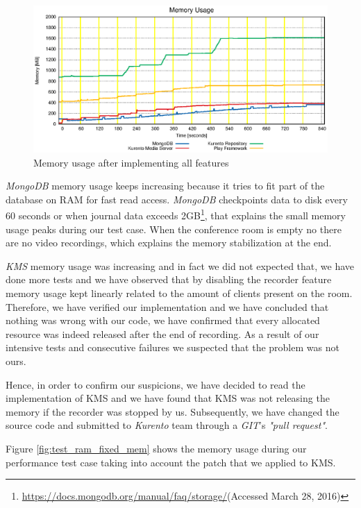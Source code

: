 \begin{figure}[!htb]
  \centering
  \includegraphics[width=\textwidth]{stats/test_full_features_mem.eps}
  \caption{Memory usage after implementing all features}
  \label{fig:test_full_features_mem}
\end{figure}


\emph{MongoDB} memory usage keeps increasing because it tries to fit part of the database on \ac{RAM} for fast read access. \emph{MongoDB} checkpoints data to disk every 60 seconds or when journal data exceeds 2GB\footnote{\url{https://docs.mongodb.org/manual/faq/storage/}(Accessed March 28, 2016)}, that explains the small memory usage peaks during our test case. When the conference room is empty no there are no video recordings, which explains the memory stabilization at the end.

\emph{KMS} memory usage was increasing and in fact we did not expected that, we have done more tests and we have observed that by disabling the recorder feature memory usage kept linearly related to the amount of clients present on the room. Therefore, we have verified our implementation and we have concluded that nothing was wrong with our code, we have confirmed that every allocated resource was indeed released after the end of recording. As a result of our intensive tests and consecutive failures we suspected that the problem was not ours.

Hence, in order to confirm our suspicions, we have decided to read the implementation of \ac{KMS} and we have found that \ac{KMS} was not releasing the memory if the recorder was stopped by us. Subsequently, we have changed the source code and submitted to \emph{Kurento} team through a \emph{GIT}'s \emph{"pull request"}.


Figure \ref{fig:test_ram_fixed_mem} shows the memory usage during our performance test case taking into account the patch that we applied to \ac{KMS}.



